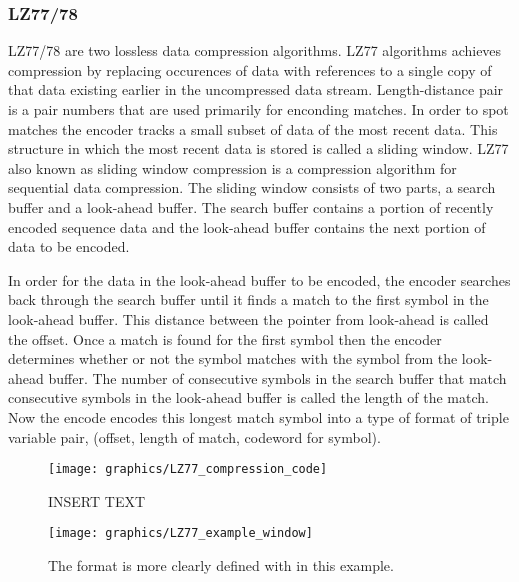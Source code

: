 \documentclass[letterpaper, 12pt]{article}
\begin{document}
\subsubsection{LZ77/78}
LZ77/78 are two lossless data compression algorithms. LZ77 algorithms achieves compression by replacing
occurences of data with references to a single copy of that data existing earlier in the uncompressed
data stream. Length-distance pair is a pair numbers that are used primarily for enconding matches. In order
to spot matches the encoder tracks a small subset of data of the most recent data. This structure in which
the most recent data is stored is called a sliding window. LZ77 also known as sliding window compression is
a compression algorithm for sequential data compression. The sliding window consists of two parts, a search
buffer and a look-ahead buffer. The search buffer contains a portion of recently encoded sequence data and
the look-ahead buffer contains the next portion of data to be encoded.
\par\vspace{\baselineskip}
In order for the data in the look-ahead buffer to be encoded, the encoder searches back through the
search buffer until it finds a match to the first symbol in the look-ahead buffer. This distance between
the pointer from look-ahead is called the offset. Once a match is found for the first symbol then the encoder
determines whether or not the symbol matches with the symbol from the look-ahead buffer. The number of
consecutive symbols in the search buffer that match consecutive symbols in the look-ahead buffer is called
the length of the match. Now the encode encodes this longest match symbol into a type of format of triple
variable pair, (offset, length of match, codeword for symbol).
\par\vspace{\baselineskip}
\begin{figure}
  \centering
  \texttt{[image: graphics/LZ77\_compression\_code]}
  \caption{INSERT TEXT}
\end{figure}

\begin{figure}
  \centering
  \texttt{[image: graphics/LZ77\_example\_window]}
  \caption{The format is more clearly defined with in this example.}
\end{figure}
\newpage
\end{document}
